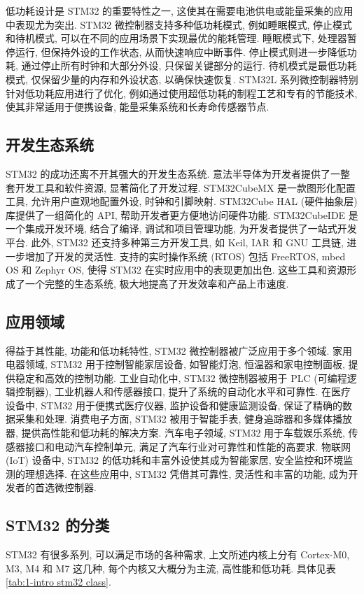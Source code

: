 低功耗设计是 STM32 的重要特性之一, 这使其在需要电池供电或能量采集的应用中表现尤为突出. STM32 微控制器支持多种低功耗模式, 例如睡眠模式, 停止模式和待机模式, 可以在不同的应用场景下实现最优的能耗管理. 睡眠模式下, 处理器暂停运行, 但保持外设的工作状态, 从而快速响应中断事件. 停止模式则进一步降低功耗, 通过停止所有时钟和大部分外设, 只保留关键部分的运行. 待机模式是最低功耗模式, 仅保留少量的内存和外设状态, 以确保快速恢复. STM32L 系列微控制器特别针对低功耗应用进行了优化, 例如通过使用超低功耗的制程工艺和专有的节能技术, 使其非常适用于便携设备, 能量采集系统和长寿命传感器节点.

\subsection{开发生态系统}

STM32 的成功还离不开其强大的开发生态系统. 意法半导体为开发者提供了一整套开发工具和软件资源, 显著简化了开发过程. STM32CubeMX 是一款图形化配置工具, 允许用户直观地配置外设, 时钟和引脚映射. STM32Cube HAL (硬件抽象层) 库提供了一组简化的 API, 帮助开发者更方便地访问硬件功能. STM32CubeIDE 是一个集成开发环境, 结合了编译, 调试和项目管理功能, 为开发者提供了一站式开发平台. 此外, STM32 还支持多种第三方开发工具, 如 Keil, IAR 和 GNU 工具链, 进一步增加了开发的灵活性. 支持的实时操作系统 (RTOS) 包括 FreeRTOS, mbed OS 和 Zephyr OS, 使得 STM32 在实时应用中的表现更加出色. 这些工具和资源形成了一个完整的生态系统, 极大地提高了开发效率和产品上市速度.

\subsection{应用领域}

得益于其性能, 功能和低功耗特性, STM32 微控制器被广泛应用于多个领域. 家用电器领域, STM32 用于控制智能家居设备, 如智能灯泡, 恒温器和家电控制面板, 提供稳定和高效的控制功能. 工业自动化中, STM32 微控制器被用于 PLC (可编程逻辑控制器), 工业机器人和传感器接口, 提升了系统的自动化水平和可靠性. 在医疗设备中, STM32 用于便携式医疗仪器, 监护设备和健康监测设备, 保证了精确的数据采集和处理. 消费电子方面, STM32 被用于智能手表, 健身追踪器和多媒体播放器, 提供高性能和低功耗的解决方案. 汽车电子领域, STM32 用于车载娱乐系统, 传感器接口和电动汽车控制单元, 满足了汽车行业对可靠性和性能的高要求. 物联网 (IoT) 设备中, STM32 的低功耗和丰富外设使其成为智能家居, 安全监控和环境监测的理想选择. 在这些应用中, STM32 凭借其可靠性, 灵活性和丰富的功能, 成为开发者的首选微控制器.

\subsection{STM32 的分类}
STM32 有很多系列, 可以满足市场的各种需求, 上文所述内核上分有 Cortex-M0, M3, M4 和 M7 这几种, 每个内核又大概分为主流, 高性能和低功耗. 具体见表 \ref{tab:1-intro stm32 class}.

